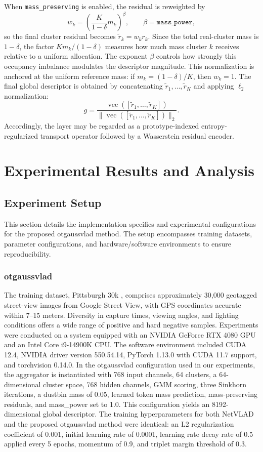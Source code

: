 \documentclass[journal]{IEEEtran}
\begin{document}
When \texttt{mass\_preserving} is enabled, the residual is reweighted by
\[
w_k = \left(\frac{K}{1-\delta}m_k\right)^\beta,\qquad \beta = \texttt{mass\_power},
\]
so the final cluster residual becomes \(\tilde{r}_k = w_k r_k\). Since the total real-cluster mass is \(1-\delta\), the factor \(K m_k/(1-\delta)\) measures how much mass cluster \(k\) receives relative to a uniform allocation. The exponent \(\beta\) controls how strongly this occupancy imbalance modulates the descriptor magnitude. This normalization is anchored at the uniform reference mass: if \(m_k = (1-\delta)/K\), then \(w_k = 1\). The final global descriptor is obtained by concatenating \(\tilde{r}_1,\ldots,\tilde{r}_K\) and applying \(\ell_2\) normalization:
\[
g = \frac{\operatorname{vec}([\tilde{r}_1,\ldots,\tilde{r}_K])}{\|\operatorname{vec}([\tilde{r}_1,\ldots,\tilde{r}_K])\|_2}.
\]
Accordingly, the layer may be regarded as a prototype-indexed entropy-regularized transport operator followed by a Wasserstein residual encoder.

\section{Experimental Results and Analysis}
\subsection{Experiment Setup}
This section details the implementation specifics and experimental configurations for the proposed otgaussvlad method. The setup encompasses training datasets, parameter configurations, and hardware/software environments to ensure reproducibility.
\subsubsection{otgaussvlad}
The training dataset, Pittsburgh 30k \cite{ref7}, comprises approximately 30,000 geotagged street-view images from Google Street View, with GPS coordinates accurate within 7--15 meters. Diversity in capture times, viewing angles, and lighting conditions offers a wide range of positive and hard negative samples. Experiments were conducted on a system equipped with an NVIDIA GeForce RTX 4080 GPU and an Intel Core i9-14900K CPU. The software environment included CUDA 12.4, NVIDIA driver version 550.54.14, PyTorch 1.13.0 with CUDA 11.7 support, and torchvision 0.14.0. In the otgaussvlad configuration used in our experiments, the aggregator is instantiated with 768 input channels, 64 clusters, a 64-dimensional cluster space, 768 hidden channels, GMM scoring, three Sinkhorn iterations, a dustbin mass of 0.05, learned token mass prediction, mass-preserving residuals, and mass\_power set to 1.0. This configuration yields an 8192-dimensional global descriptor. The training hyperparameters for both NetVLAD and the proposed otgaussvlad method were identical: an L2 regularization coefficient of 0.001, initial learning rate of 0.0001, learning rate decay rate of 0.5 applied every 5 epochs, momentum of 0.9, and triplet margin threshold of 0.3.
\end{document}
